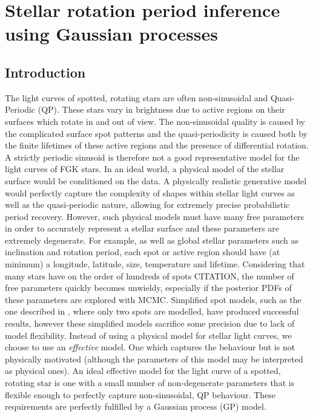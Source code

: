 \chapter{Stellar rotation period inference using Gaussian processes}
\section{Introduction}

The light curves of spotted, rotating stars are often non-sinusoidal and
Quasi-Periodic (QP).
These stars vary in brightness due to active regions on their surfaces which
rotate in and out of view.
The non-sinusoidal quality is caused by the complicated surface spot patterns
and the quasi-periodicity is caused both by the finite lifetimes of these
active regions and the presence of differential rotation.
A strictly periodic sinusoid is therefore not a good representative
model for the light curves of FGK stars.
In an ideal world, a physical model of the stellar surface would be
conditioned on the data.
A physically realistic generative model would perfectly capture the
complexity of shapes within stellar light curves as well as the
quasi-periodic nature, allowing for extremely precise probabilistic period
recovery.
However, such physical models must have many free parameters in order to
accurately represent a stellar surface and these parameters are extremely
degenerate.
For example, as well as global stellar parameters such as inclination and
rotation period, each spot or active region should have (at minimum) a
longitude, latitude, size, temperature and lifetime.
Considering that many stars have on the order of hundreds of spots CITATION,
the number of free parameters quickly becomes unwieldy, especially if the
posterior PDFs of these parameters are explored with MCMC.
Simplified spot models, such as the one described in \citet{lanza}, where
only two spots are modelled, have produced successful results, however these
simplified models sacrifice some precision due to lack of model flexibility.
Instead of using a physical model for stellar light curves, we choose to use
an {\it effective} model.
One which captures the behaviour but is not physically motivated (although
the parameters of this model may be interpreted as physical ones).
An ideal effective model for the light curve of a spotted, rotating star is
one with a small number of non-degenerate parameters that is flexible enough
to perfectly capture non-sinusoidal, QP behaviour.
These requirements are perfectly fulfilled by a Gaussian process (GP) model.

